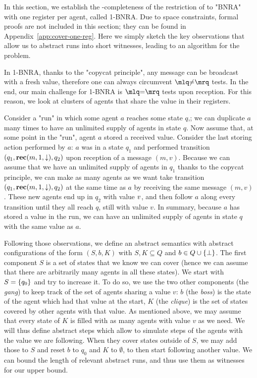 In this section, we establish the \NP-completeness of the restriction of \COVER to "BNRA" with one register per agent, called 1-BNRA. Due to space constraints, formal proofs are not included in this section; they can be found in Appendix~\ref{app:cover-one-reg}. Here we simply sketch the key observations that allow us to abstract runs into short witnesses, leading to an \NP algorithm for the problem.
	
	In 1-BNRA, thanks to the "copycat principle", any  message can be broadcast with a fresh value, therefore one can always circumvent $\quotemarks{\diseqtestact}$ tests. In the end, our main challenge for 1-BNRA is $\quotemarks{\eqtestact}$ tests upon reception.
	For this reason, we look at clusters of agents that share the value in their registers. 

	Consider a "run" in which some agent $a$ reaches some state $q$,; we can duplicate $a$ many times to have an unlimited supply of agents in state $q$.
	Now assume that, at some point in the "run", agent $a$ stored a received value. Consider the last storing action performed by $a$: $a$ was in a state $q_1$ and performed transition $(q_1, \textbf{rec}(m, 1, \downarrow), q_2)$ upon reception of a message $(m,v)$. 
	Because we can assume that we have an unlimited supply of agents in $q_1$ thanks to the copycat principle, we can make as many agents as we want take transition $(q_1, \textbf{rec}(m, 1, \downarrow), q_2)$ at the same time as $a$ by receiving the same message $(m,v)$. These new agents end up in $q_2$ with value $v$, and then follow $a$ along every transition until they all reach $q$, still with value $v$. In summary, because $a$ has stored a value in the run, we can have an unlimited supply of agents in state $q$ with the same value as $a$. 
	
	Following those observations, we define an abstract semantics with abstract configurations of the form $(S, b, K)$ with $S, K \subseteq Q$ and $b \in Q \cup \{\bot\}$. The first component $S$ is a set of states that we know we can cover (hence we can assume that there are arbitrarily many agents in all these states).
	We start with $S = \{q_0\}$ and try to increase it. To do so, we use the two other components (the \emph{gang}) to keep track of the set of agents sharing a value $v$: $b$ (the \emph{boss}) is the state of the agent which had that value at the start, $K$ (the \emph{clique}) is the set of states covered by other agents with that value. As mentioned above, we may assume that every state of $K$ is filled with as many agents with value $v$ as we need. 
	We will thus define abstract steps which allow to simulate steps of the agents with the value we are following. When they cover states outside of $S$, we may add those to $S$ and reset $b$ to $q_0$ and $K$  to $\emptyset$, to then start following another value.
	We can bound the length of relevant abstract runs, and thus use them as witnesses for our \NP upper bound.
	
